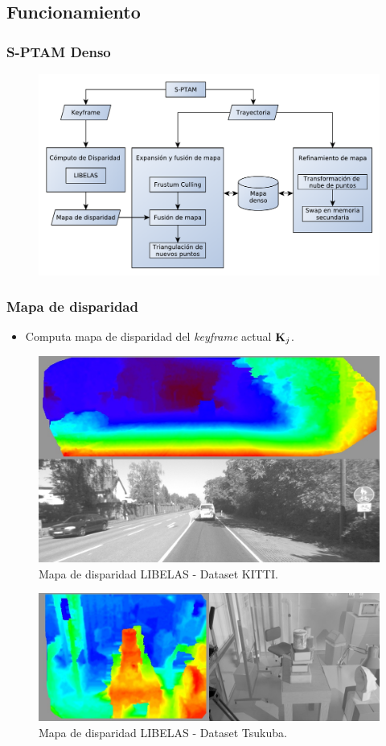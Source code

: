 \documentclass[compress]{beamer}
\begin{document}
\subsection{Funcionamiento}


\begin{frame}

	\frametitle{S-PTAM Denso}
	\begin{figure}[htb]
		\centering
		\includegraphics[width=1.0\columnwidth]{method/metodo-diagram.pdf}
		\hfill
	\end{figure}
\end{frame}


\begin{frame}
	\frametitle{Mapa de disparidad}

	\begin{itemize}
		\item Computa mapa de disparidad del \emph{keyframe} actual $\boldsymbol{\mathbf{K}}_{j}$.
	\end{itemize}
	
	\begin{figure}[htb]
		\centering
		\includegraphics[width=0.4\columnwidth]{method/libelas_merge_kitti04_22.jpg}
		\caption{Mapa de disparidad LIBELAS - Dataset KITTI.}
	\end{figure}

	\begin{figure}[htb]
		\centering
		\includegraphics[width=0.4\columnwidth]{method/libelas_merge_tsukuba_222.jpg}
		\caption{Mapa de disparidad LIBELAS - Dataset Tsukuba.}
	\end{figure}

\end{frame}
\end{document}
